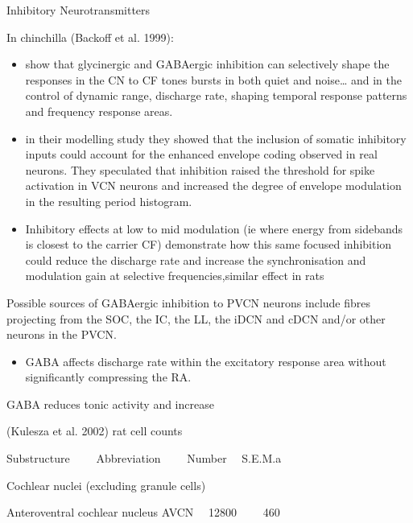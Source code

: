 \documentclass[10pt,a4paper]{article}
\begin{document}
Inhibitory Neurotransmitters
\citep{BackoffPalombiEtAl:1997,Caspary:1990,CasparyBackoffEtAl:1994,CasparyHaveyEtAl:1979,CasparyPazaraEtAl:1987,EbertOstwald:1995,
  EvansZhao:1993,MartinDicksonEtAl:1982,PalombiCaspary:1992,WickesbergOertel:1990,ZhaoEvans:1990}

In chinchilla (Backoff et al. 1999):


\begin{itemize}
\item
  \citep{CasparyBackoffEtAl:1994,CasparyHelfertEtAl:1997,CasparyPalombiEtAl:1993,EbertOstwald:1995,PalombiCaspary:1992}
  show that glycinergic and GABAergic inhibition can selectively shape the
  responses in the CN to CF tones bursts in both quiet and noise{\dots} and in
  the control of dynamic range, discharge rate, shaping temporal response
  patterns and frequency response areas.
\item \citep{WangSachs:1995,WangSachsEtAl:1992} in their modelling study they
  showed that the inclusion of somatic inhibitory inputs could account for the
  enhanced envelope coding observed in real neurons.  They speculated that
  inhibition raised the threshold for spike activation in VCN neurons and
  increased the degree of envelope modulation in the resulting period histogram.
\item Inhibitory effects at low to mid modulation (ie where energy from
  sidebands is closest to the carrier CF) demonstrate how this same focused
  inhibition could reduce the discharge rate and increase the synchronisation
  and modulation gain at selective frequencies,similar effect in rats
  \citep{Moller:1972}
\end{itemize}

\citep{PalombiCaspary:1992}Possible sources of GABAergic inhibition to PVCN
neurons include fibres projecting from the SOC, the IC, the LL, the iDCN and
cDCN and/or other neurons in the PVCN.


\begin{itemize}
\item GABA affects discharge rate within the excitatory response area without  significantly compressing the RA.
\end{itemize}
GABA reduces tonic activity and increase

(Kulesza et al. 2002) rat cell counts

Substructure \ \ \ \ Abbreviation \ \ \ \ Number \ \ S.E.M.a

Cochlear nuclei (excluding granule cells)

Anteroventral cochlear nucleus AVCN \ \ 12800 \ \ \ \ 460
\end{document}
